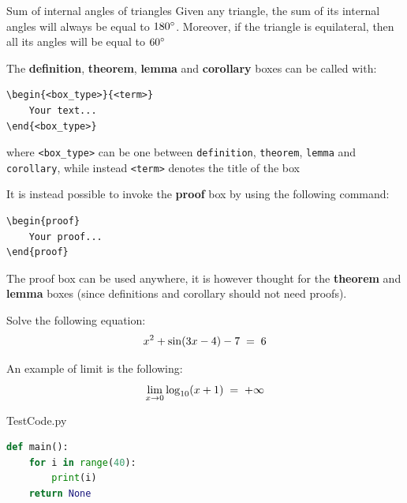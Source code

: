\documentclass[]{notex}
\begin{document}
\begin{corollary}{Sum of internal angles of triangles}
    Given any triangle, the sum of its internal angles will always be equal to $180\degree$. Moreover, if the triangle is equilateral, then all its angles will be equal to $60\degree$
\end{corollary}
\medskip
\noindent The \textbf{definition}, \textbf{theorem}, \textbf{lemma} and \textbf{corollary} boxes can be called with:
\begin{tcolorbox}
    \begin{verbatim}
\begin{<box_type>}{<term>}
    Your text...
\end{<box_type>}\end{verbatim}

\noindent where \verb|<box_type>| can be one between \texttt{definition}, \texttt{theorem}, \texttt{lemma} and \texttt{corollary}, while instead \verb|<term>| denotes the title of the box
\end{tcolorbox}

\noindent It is instead possible to invoke the \textbf{proof} box by using the following command:

\begin{tcolorbox}
    \begin{verbatim}
\begin{proof}
    Your proof...
\end{proof}\end{verbatim}
\end{tcolorbox}

\noindent The proof box can be used anywhere, it is however thought for the \textbf{theorem} and \textbf{lemma} boxes (since definitions and corollary should not need proofs).

\begin{exercise}
    Solve the following equation:
    \[ x^2 + \sin(3x-4) - 7 \; = \; 6 \]
\end{exercise}

\begin{example}
    An example of limit is the following:
    \[ \lim_{x \to 0} \log_{10}(x+1) \; = \; +\infty \]
\end{example}

\pagebreak

\begin{codeblock}{TestCode.py}
    \begin{lstlisting}[language = Python]
def main():
    for i in range(40):
        print(i)
    return None\end{lstlisting}
\end{codeblock}
\end{document}
